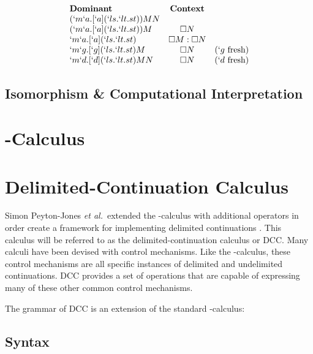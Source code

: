   \begin{example}
    \[
    \begin{array}{lcr}
    \textbf{Dominant} & \textbf{Context} \\
    (`m`a.[`a](`ls.`lt.st)) M N \\
    (`m`a.[`a](`ls.`lt.st))M & \square N \\
    `m`a.[`a](`ls.`lt.st) & \square M:\square N \\
    `m`g.[`g](`ls.`lt.st)M & \square N & (`g\ \text{fresh}) \\
    `m`d.[`d](`ls.`lt.st)MN & \square N & (`d\ \text{fresh}) \\
    \end{array}
    \]
  \end{example}
  
  \subsection{Isomorphism \& Computational Interpretation}

\section{\ltry-Calculus}

\section{Delimited-Continuation Calculus}

  Simon Peyton-Jones \textit{et al.}\ extended the \lam-calculus with additional operators in order create a framework for implementing delimited continuations \cite{JonesDS07}. This calculus will be referred to as the delimited-continuation calculus or DCC. Many calculi have been devised with control mechanisms. Like the \lmu-calculus, these control mechanisms are all specific instances of delimited and undelimited continuations. DCC provides a set of operations that are capable of expressing many of these other common control mechanisms.

  The grammar of DCC is an extension of the standard \lam-calculus:

  \subsection{Syntax}
  \begin{figure}[!h]
  \end{figure}

